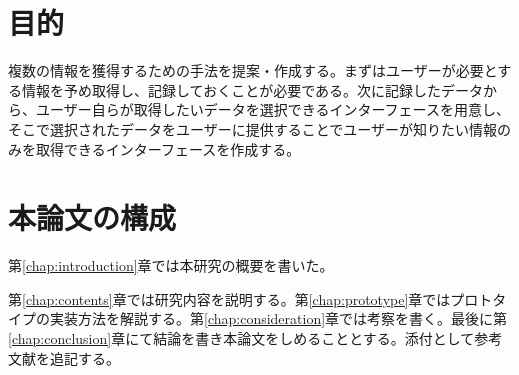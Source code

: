 \section{目的}
複数の情報を獲得するための手法を提案・作成する。まずはユーザーが必要とする情報を予め取得し、記録しておくことが必要である。次に記録したデータから、ユーザー自らが取得したいデータを選択できるインターフェースを用意し、そこで選択されたデータをユーザーに提供することでユーザーが知りたい情報のみを取得できるインターフェースを作成する。

\section{本論文の構成}
第\ref{chap:introduction}章では本研究の概要を書いた。

第\ref{chap:contents}章では研究内容を説明する。第\ref{chap:prototype}章ではプロトタイプの実装方法を解説する。第\ref{chap:consideration}章では考察を書く。最後に第\ref{chap:conclusion}章にて結論を書き本論文をしめることとする。添付として参考文献を追記する。
